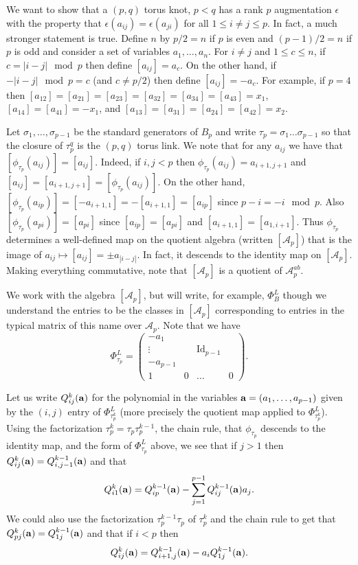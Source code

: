 \documentclass[11pt]{amsart}
\def\A{{\mathcal A}}
\begin{document}
We want to show that a $(p,q)$ torus knot, $p<q$ has a rank $p$ augmentation $\epsilon$ with the property that $\epsilon(a_{ij})=\epsilon(a_{ji})$ for all $1\le i\ne j\le p$. In fact, a much stronger statement is true. Define $n$ by $p/2 = n$ if $p$ is even and $(p-1)/2 = n$ if $p$ is odd and consider a set of variables $a_1,\ldots,a_n$. For $i\ne j$ and $1\le c\le n$, if $c = |i-j|\mod p$ then define $[a_{ij}] = a_c$. On the other hand, if $-|i-j|\mod p = c$ (and $c\ne p/2$) then define $[a_{ij}] = -a_c$. For example, if $p=4$ then $[a_{12}]=[a_{21}]=[a_{23}]=[a_{32}]=[a_{34}]=[a_{43}]=x_1$, $[a_{14}]=[a_{41}]=-x_1$, and $[a_{13}]=[a_{31}]=[a_{24}]=[a_{42}]=x_2$.

Let $\sigma_1,\ldots,\sigma_{p-1}$ be the standard generators of $B_p$ and write $\tau_p = \sigma_1\ldots\sigma_{p-1}$ so that the closure of $\tau_p^q$ is the $(p,q)$ torus link. We note that for any $a_{ij}$ we have that $[\phi_{\tau_p}(a_{ij})]=[a_{ij}]$. Indeed, if $i,j<p$ then $\phi_{\tau_p}(a_{ij}) = a_{i+1,j+1}$ and $[a_{ij}]=[a_{i+1,j+1}]=[\phi_{\tau_p}(a_{ij})]$. On the other hand, $[\phi_{\tau_p}(a_{ip})]=[-a_{i+1,1}]=-[a_{i+1,1}] = [a_{ip}]$ since $p-i = -i\mod p$. Also $[\phi_{\tau_p}(a_{pi})]=[a_{pi}]$ since $[a_{ip}]=[a_{pi}]$ and $[a_{i+1,1}]=[a_{1,i+1}]$. Thus $\phi_{\tau_p}$ determines a well-defined map on the quotient algebra (written $[\A_p]$) that is the image of $a_{ij}\mapsto [a_{ij}] = \pm a_{|i-j|}$. In fact, it descends to the identity map on $[\A_p]$. Making everything commutative, note that $[\A_p]$ is a quotient of $\A_p^{ab}$.

We work with the algebra $[\A_p]$, but will write, for example, $\Phi_B^L$ though we understand the entries to be the classes in $[\A_p]$ corresponding to entries in the typical matrix of this name over $\A_p$. Note that we have
  \[\Phi_{\tau_p}^L = \begin{pmatrix}-a_1  &&  & \\ \vdots  && \text{Id}_{p-1} & \\ -a_{p-1} && & \\ 1& 0& \ldots &0\end{pmatrix}.\]

Let us write $Q_{ij}^k({\bf a})$ for the polynomial in the variables ${\bf a} = (a_1,\ldots,a_{p-1})$ given by the $(i,j)$ entry of $\Phi_{\tau_p^k}^L$ (more precisely the quotient map applied to $\Phi_{\tau_p^k}^L$). Using the factorization $\tau_p^k = \tau_p\tau_p^{k-1}$, the chain rule, that $\phi_{\tau_p}$ descends to the identity map, and the form of $\Phi_{\tau_p}^L$ above, we see that if $j>1$ then $Q_{ij}^k({\bf a}) = Q_{i,j-1}^{k-1}({\bf a})$ and that 
    \begin{equation}
    Q_{i1}^k({\bf a}) = Q_{ip}^{k-1}({\bf a}) - \sum_{j=1}^{p-1}Q_{ij}^{k-1}({\bf a})a_j.
    \label{eqn1}
    \end{equation}
We could also use the factorization $\tau_p^{k-1}\tau_p$ of $\tau_p^k$ and the chain rule to get that $Q_{pj}^k({\bf a}) = Q_{1j}^{k-1}({\bf a})$ and that if $i<p$ then
    \begin{equation}
    Q_{ij}^k({\bf a}) = Q_{i+1,j}^{k-1}({\bf a}) - a_iQ_{1j}^{k-1}({\bf a}).
    \label{eqn2}
    \end{equation}
\end{document}
